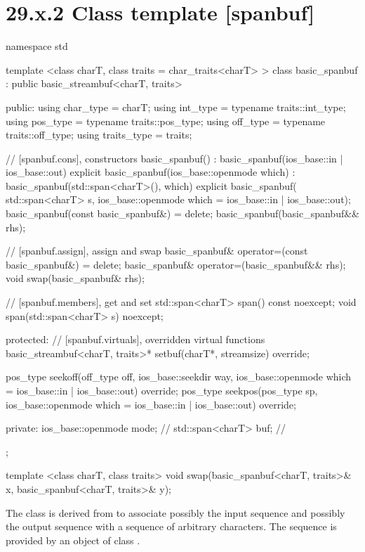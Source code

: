 \documentclass[ebook,11pt,article]{memoir}
\renewcommand{\iref}[1]{[#1]}
\begin{document}
\section{29.x.2 Class template  [spanbuf]}
\begin{codeblock}
namespace std {
  template <class charT, class traits = char_traits<charT> >
  class basic_spanbuf
    : public basic_streambuf<charT, traits> {
  public:
    using char_type      = charT;
    using int_type       = typename traits::int_type;
    using pos_type       = typename traits::pos_type;
    using off_type       = typename traits::off_type;
    using traits_type    = traits;

    // \iref{spanbuf.cons}, constructors
    basic_spanbuf() : basic_spanbuf(ios_base::in | ios_base::out) {}
    explicit basic_spanbuf(ios_base::openmode which)
      : basic_spanbuf(std::span<charT>(), which) {}
    explicit basic_spanbuf(
      std::span<charT> s,
      ios_base::openmode which = ios_base::in | ios_base::out);
    basic_spanbuf(const basic_spanbuf&) = delete;
    basic_spanbuf(basic_spanbuf&& rhs);

    // \iref{spanbuf.assign}, assign and swap
    basic_spanbuf& operator=(const basic_spanbuf&) = delete;
    basic_spanbuf& operator=(basic_spanbuf&& rhs);
    void swap(basic_spanbuf& rhs);

    // \iref{spanbuf.members}, get and set
    std::span<charT> span() const noexcept;
    void span(std::span<charT> s) noexcept;

  protected:
    // \iref{spanbuf.virtuals}, overridden virtual functions
    basic_streambuf<charT, traits>* setbuf(charT*, streamsize) override;

    pos_type seekoff(off_type off, ios_base::seekdir way,
                     ios_base::openmode which
                      = ios_base::in | ios_base::out) override;
    pos_type seekpos(pos_type sp,
                     ios_base::openmode which
                      = ios_base::in | ios_base::out) override;

  private:
    ios_base::openmode mode;  // \expos
    std::span<charT> buf; // \expos
  };

  template <class charT, class traits>
    void swap(basic_spanbuf<charT, traits>& x,
              basic_spanbuf<charT, traits>& y);
}
\end{codeblock}

\pnum
The class
is derived from
to associate possibly the input sequence and possibly
the output sequence with a sequence of arbitrary characters.
The sequence is provided by an object of class
.
\end{document}
